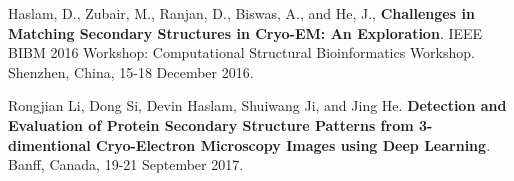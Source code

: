 \begin{cventries}
  \cventryr
    {}
    {}
    {}
    {}
    {
    \begin{cvitems}
    \item{Haslam, D., Zubair, M., Ranjan, D., Biswas, A., and He, J., \textbf{Challenges in Matching Secondary Structures in Cryo-EM: An Exploration}. IEEE BIBM 2016 Workshop: Computational Structural Bioinformatics Workshop. Shenzhen, China, 15-18 December 2016.}
    \end{cvitems}
    }
    \vspace{5mm}
    \cventryr
    {}
    {}
    {}
    {}
    {
    \begin{cvitems}
    \item{Rongjian Li, Dong Si, Devin Haslam, Shuiwang Ji, and Jing He. \textbf{Detection and Evaluation of Protein Secondary Structure Patterns from 3-dimentional Cryo-Electron Microscopy Images using Deep Learning}. Banff, Canada, 19-21 September 2017.}
    \end{cvitems}
    }
\end{cventries}
